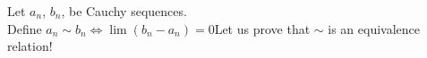 \documentclass[preview]{standalone}
\begin{document}
\begin{center}
Let $a_n$, $b_n$, be Cauchy sequences.\\Define $a_n\sim b_n \iff \lim(b_n - a_n) = 0$Let us prove that $\sim$ is an equivalence relation!
\end{center}
\end{document}
